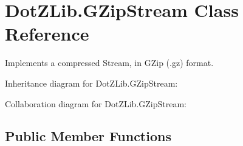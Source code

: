 \hypertarget{class_dot_z_lib_1_1_g_zip_stream}{\section{Dot\+Z\+Lib.\+G\+Zip\+Stream Class Reference}
\label{class_dot_z_lib_1_1_g_zip_stream}
}


Implements a compressed Stream, in G\+Zip (.gz) format.  




Inheritance diagram for Dot\+Z\+Lib.\+G\+Zip\+Stream\+:


Collaboration diagram for Dot\+Z\+Lib.\+G\+Zip\+Stream\+:
\subsection*{Public Member Functions}
